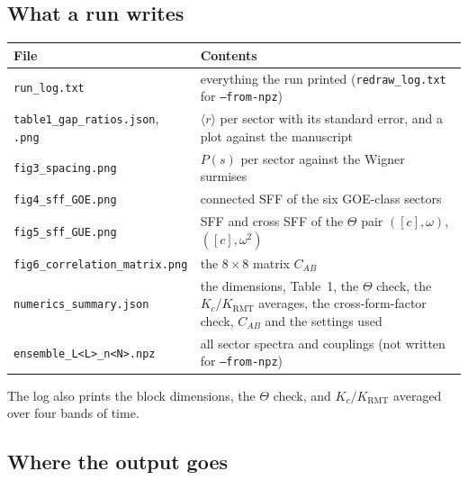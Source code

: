 \documentclass[11pt,a4paper]{article}
\newcommand{\code}[1]{\texttt{\textcolor{codeink}{#1}}}
\begin{document}
\subsection{What a run writes}\label{sec:writes}

\begingroup\small
\begin{tabularx}{\linewidth}{L{5.4cm}Y}
\toprule{}\textbf{File} & \textbf{Contents}\\\midrule
\code{run\_log.txt} & everything the run printed (\code{redraw\_log.txt} for \code{--from-npz})\\
\code{table1\_gap\_ratios.json}, \code{.png} & $\langle r\rangle$ per sector with its standard error, and a plot against the manuscript\\
\code{fig3\_spacing.png} & $P(s)$ per sector against the Wigner surmises\\
\code{fig4\_sff\_GOE.png} & connected SFF of the six GOE-class sectors\\
\code{fig5\_sff\_GUE.png} & SFF and cross SFF of the $\Theta$ pair $([c],\omega)$, $([c],\omega^2)$\\
\code{fig6\_correlation\_matrix.png} & the $8\times 8$ matrix $C_{AB}$\\
\code{numerics\_summary.json} & the dimensions, Table~1, the $\Theta$ check, the $K_c/K_{\mathrm{RMT}}$ averages, the
  cross-form-factor check, $C_{AB}$ and the settings used\\
\code{ensemble\_L<L>\_n<N>.npz} & all sector spectra and couplings (not written for \code{--from-npz})\\
\bottomrule
\end{tabularx}\par
\endgroup

The log also prints the block dimensions, the $\Theta$ check, and $K_c/K_{\mathrm{RMT}}$ averaged over four bands of time.

\subsection{Where the output goes}\label{sec:folders}
\end{document}
